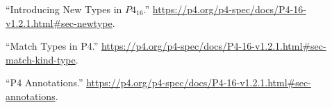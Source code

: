 \documentclass[11pt]{article}
\begin{document}
{{\begin{thebibliography}{39}
\mdbibitemlabel{{}[11]}\textquotedblleft{}Introducing New Types in $P4_{16}$.\textquotedblright{} \href{https://p4.org/p4-spec/docs/P4-16-v1.2.1.html\%23sec-newtype}{{\ttfamily https://\hspace{0pt}p4.\hspace{0pt}org/\hspace{0pt}p4-\hspace{0pt}spec/\hspace{0pt}docs/\hspace{0pt}P4-\hspace{0pt}16-\hspace{0pt}v1.\hspace{0pt}2.\hspace{0pt}1.\hspace{0pt}html\#\hspace{0pt}sec-\hspace{0pt}newtype}}.\label{p4newtypes}%

\mdbibitemlabel{{}[12]}\textquotedblleft{}Match Types in P4.\textquotedblright{} \href{https://p4.org/p4-spec/docs/P4-16-v1.2.1.html\%23sec-match-kind-type}{{\ttfamily https://\hspace{0pt}p4.\hspace{0pt}org/\hspace{0pt}p4-\hspace{0pt}spec/\hspace{0pt}docs/\hspace{0pt}P4-\hspace{0pt}16-\hspace{0pt}v1.\hspace{0pt}2.\hspace{0pt}1.\hspace{0pt}html\#\hspace{0pt}sec-\hspace{0pt}match-\hspace{0pt}kind-\hspace{0pt}type}}.\label{p4matchtypes}%

\mdbibitemlabel{{}[13]}\textquotedblleft{}P4 Annotations.\textquotedblright{} \href{https://p4.org/p4-spec/docs/P4-16-v1.2.1.html\%23sec-annotations}{{\ttfamily https://\hspace{0pt}p4.\hspace{0pt}org/\hspace{0pt}p4-\hspace{0pt}spec/\hspace{0pt}docs/\hspace{0pt}P4-\hspace{0pt}16-\hspace{0pt}v1.\hspace{0pt}2.\hspace{0pt}1.\hspace{0pt}html\#\hspace{0pt}sec-\hspace{0pt}annotations}}.\label{p4annotations}%


\end{thebibliography}}}
\end{document}
